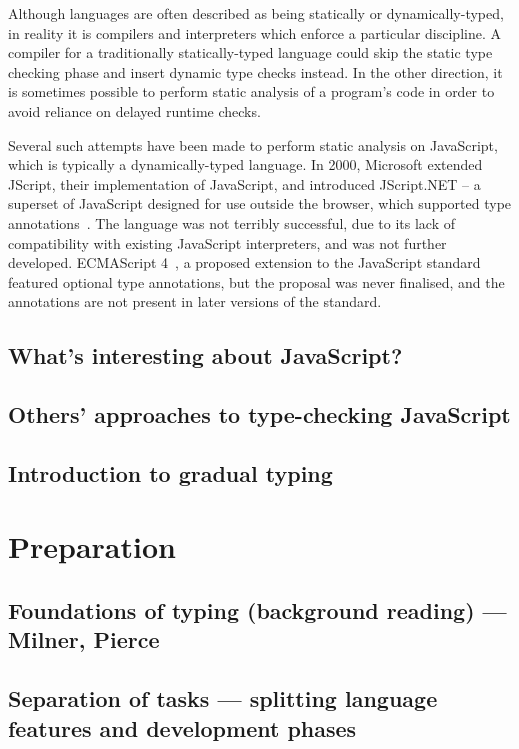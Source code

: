 \documentclass[12pt,a4paper,twoside,openright]{report}
\begin{document}
Although languages are often described as being statically or
dynamically-typed, in reality it is compilers and interpreters which enforce a
particular discipline. A compiler for a traditionally statically-typed language
could skip the static type checking phase and insert dynamic type checks
instead. In the other direction, it is sometimes possible to perform static
analysis of a program's code in order to avoid reliance on delayed runtime
checks.

Several such attempts have been made to perform static analysis on JavaScript,
which is typically a dynamically-typed language. In 2000, Microsoft extended
JScript, their implementation of JavaScript, and introduced JScript.NET -- a %
superset of JavaScript designed for use outside the browser, which supported
type annotations~\cite{jscript}. The language was not terribly successful, due
to its lack of compatibility with existing JavaScript interpreters, and was not
further developed. ECMAScript 4~\cite{es4}, a proposed extension to the JavaScript
standard featured optional type annotations, but the proposal was never
finalised, and the annotations are not present in later versions of the
standard.

\printbibliography{}
\section{What's interesting about JavaScript?}
\section{Others' approaches to type-checking JavaScript}
\section{Introduction to gradual typing}

\chapter{Preparation}\label{preparation}
\section{Foundations of typing (background reading) --- Milner, Pierce}
\section{Separation of tasks --- splitting language features and development phases}
\end{document}
